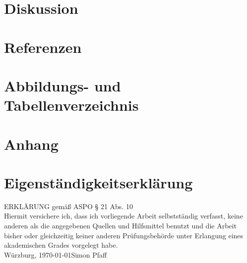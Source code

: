 \documentclass{scrartcl}
\begin{document}
\section{Diskussion}
\label{sec-4}
\subsection{}
\label{sec-4-1}


\section{Referenzen}
\label{sec-5}

\section{Abbildungs- und Tabellenverzeichnis}
\label{sec-6}
\listoffigures

\listoftables
\section{Anhang}
\label{sec-7}
\section*{Eigenständigkeitserklärung}
ERKLÄRUNG gemäß ASPO § 21 Abs. 10\\[10mm]
Hiermit versichere ich, dass ich vorliegende Arbeit selbstständig verfasst, keine anderen als
die angegebenen Quellen und Hilfsmittel benutzt und die Arbeit bisher oder gleichzeitig
keiner anderen Prüfungsbehörde unter Erlangung eines akademischen Grades
vorgelegt habe.\\[20mm]
Würzburg, \today \hfill Simon Pfaff
\clearpage
\end{document}
